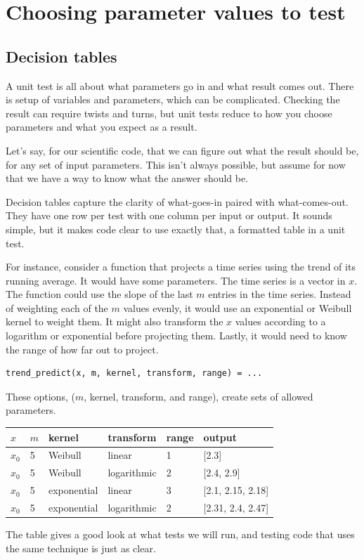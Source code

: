 \documentclass[fleqn,10pt]{olplainarticle}
\begin{document}
\section{Choosing parameter values to test}\label{sec:parameter-logic}



\subsection{Decision tables}\label{sec:parameter-decision}

A unit test is all about what parameters go in and what result
comes out. There is setup of variables and
parameters, which can be complicated. Checking the result can
require twists and turns, but unit tests reduce to how you choose
parameters and what you expect as a result.

Let's say, for our scientific code, that we can figure out what the result
should be, for any set of input parameters. This isn't always
possible, but assume
for now that we have a way to know what the answer should be.

Decision tables capture the clarity of what-goes-in paired
with what-comes-out. They have one row per test with one
column per input or output. It sounds simple, but it
makes code clear to use exactly that, a formatted
table in a unit test.

For instance, consider a function that projects a time series
using the trend of its running average. It would have some parameters.
The time series is a
vector in $x$. The function could use the slope
of the last $m$ entries in the time series. Instead of weighting
each of the $m$ values evenly, it would use an exponential or
Weibull kernel to weight them. It might also
transform the $x$ values according to a logarithm or exponential
before projecting them. Lastly, it would need to know the range
of how far out to project.
\begin{lstlisting}
trend_predict(x, m, kernel, transform, range) = ...
\end{lstlisting}
These options, ($m$, kernel, transform, and range), create
sets of allowed parameters.
\begin{center}
\begin{tabular}{|l|l|l|l|l||l|}\hline
$x$ & $m$ & kernel & transform & range & output \\ \hline
$x_0$ & 5 & Weibull & linear & 1 & [2.3] \\
$x_0$ & 5 & Weibull & logarithmic & 2 & [2.4, 2.9] \\
$x_0$ & 5 & exponential & linear & 3 & [2.1, 2.15, 2.18] \\
$x_0$ & 5 & exponential & logarithmic & 2 & [2.31, 2.4, 2.47] \\ \hline
\end{tabular}
\end{center}
The table gives a good look at what tests we will run, and testing code
that uses the same technique is just as clear.
\end{document}
